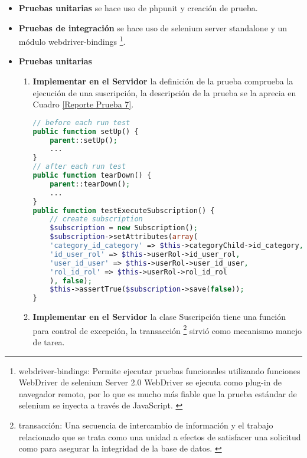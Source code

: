 \begin{itemize}

\item \textbf{Pruebas unitarias} se hace uso de phpunit y creación de prueba.

\item \textbf{Pruebas de integración} se hace uso de selenium server
standalone y un módulo webdriver-bindings \footnote{webdriver-bindings:
Permite ejecutar pruebas funcionales utilizando funciones WebDriver de
selenium Server 2.0 WebDriver se ejecuta como plug-in de navegador remoto,
por lo que es mucho más fiable que la prueba estándar de selenium se inyecta
a través de JavaScript. \cite{webdriverTest}}.

\end{itemize}


\begin{itemize}

\item \textbf{Pruebas unitarias}

\begin{enumerate}

\item \textbf{Implementar en el Servidor} la definición de la prueba
 comprueba la ejecución de una
suscripción, la descripción de la prueba se la aprecia en 
Cuadro \ref{Reporte Prueba 7}.

\begin{lstlisting}[language=PHP, caption={Prueba ejecución de suscripción.}]
// before each run test
public function setUp() {
    parent::setUp();
    ...
}
// after each run test
public function tearDown() {
    parent::tearDown();
    ...
}
public function testExecuteSubscription() {
    // create subscription
    $subscription = new Subscription();
    $subscription->setAttributes(array(
    'category_id_category' => $this->categoryChild->id_category,
    'id_user_rol' => $this->userRol->id_user_rol,
    'user_id_user' => $this->userRol->user_id_user,
    'rol_id_rol' => $this->userRol->rol_id_rol
    ), false);
    $this->assertTrue($subscription->save(false));
}
\end{lstlisting}

\item \textbf{Implementar en el Servidor} la clase Suscripción tiene una
función para control de excepción, la transacción \footnote{transacción:
Una secuencia de intercambio de información y el trabajo relacionado que se
trata como una unidad a efectos de satisfacer una solicitud como para
asegurar la integridad de la base de datos. \cite{transaction}} sirvió como
mecanismo manejo de tarea. 


\end{enumerate}
\end{itemize}
